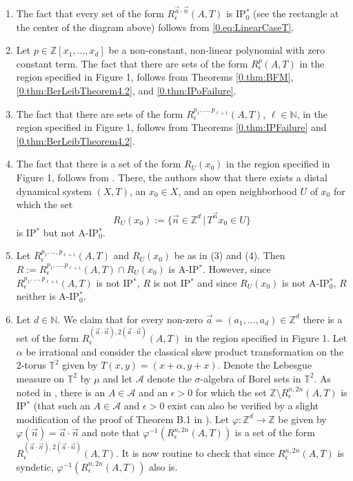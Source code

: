 \documentclass[11pt,american,preprint]{elsarticle}
\numberwithin{equation}{section}
\theoremstyle{plain}
\theoremstyle{plain*}
\theoremstyle{plain}
\theoremstyle{plain*}
\theoremstyle{plain}
\theoremstyle{plain*}
\theoremstyle{remark}
\theoremstyle{remark*}
\theoremstyle{remark}
\theoremstyle{remark*}
\theoremstyle{remark}
\theoremstyle{remark*}
\theoremstyle{plain}
\theoremstyle{definition}
\theoremstyle{plain}
\theoremstyle{plain} %
\newcommand{\N}{\mathbb{N}}
\newcommand{\Z}{\mathbb{Z}}
\begin{document}
\begin{enumerate}[(1)]
\item The fact that  every  set of the form $R_\epsilon^{\vec a\cdot \vec n}(A,T)$ is IP$_0^*$ (see the rectangle at the center of the diagram above) follows from \eqref{0.eq:LinearCaseT}. 
\item Let $p\in\Z[x_1,...,x_d]$ be a non-constant, non-linear polynomial with zero constant term. The fact that there are sets of the form $R_\epsilon^p(A,T)$  in the region specified in Figure 1, follows from Theorems  \ref{0.thm:BFM},  \ref{0.thm:BerLeibTheorem4.2}, and \ref{0.thm:IPoFailure}.
\item The fact that there are sets of the form $R_\epsilon^{p_1,...,p_{\ell+1}}(A,T)$, $\ell\in\N$,  in the region specified in Figure 1, follows from Theorems  \ref{0.thm:IPFailure} and \ref{0.thm:BerLeibTheorem4.2}.
\item The fact that there is a set of the form $R_U(x_0)$  in the region specified in Figure 1, follows from \cite[p. 505]{AlmostIPBerLeib}.  There, the authors show that there exists a distal dynamical system $(X,T)$, an $x_0\in X$, and an open neighborhood $U$ of $x_0$ for which the set 
$$R_U(x_0):=\{\vec n\in \Z^d\,|\,T^{\vec n}x_0\in U\}$$
is IP$^*$ but not A-IP$_0^*$. 
\item Let $R_\epsilon^{p_1,...,p_{\ell+1}}(A,T)$ and $R_U(x_0)$ be as in (3) and (4). Then $R:=R_\epsilon^{p_1,...,p_{\ell+1}}(A,T)\cap R_U(x_0)$ is A-IP$^*$. However, since $R_\epsilon^{p_1,...,p_{\ell+1}}(A,T)$ is not IP$^*$, $R$ is not IP$^*$ and since  $R_U(x_0)$ is not A-IP$_0^*$, $R$ neither is A-IP$_0^*$.
\item Let $d\in\N$. We claim that for every non-zero $\vec a=(a_1,...,a_d)\in \Z^d$ there is a set of the form 
$R^{(\vec a\cdot\vec n),2(\vec a\cdot\vec n)}_\epsilon(A,T)$  in the region specified in Figure 1. Let $\alpha$ be irrational and consider the classical skew product transformation on the 2-torus $\mathbb T^2$ given by $T(x,y)=(x+\alpha,y+x)$. Denote the Lebesgue measure on $\mathbb T^2$ by $\mu$ and let  $\mathcal A$ denote the $\sigma$-algebra of Borel sets in $\mathbb T^2$. 
As noted in \cite[Subsection 8.1]{BHFebruary2003}, there is  an $A\in \mathcal A$ and an $\epsilon>0$ for which the set 
$\Z\setminus R_\epsilon ^{n,2n}(A,T)$ is IP$^*$  (that such an $A\in\mathcal A$ and $\epsilon>0$ exist can also be verified by  a slight modification of the  proof of Theorem  B.1  in  \cite{Shalomkra2025}). Let $\varphi:\Z^d\rightarrow \Z$ be given by $\varphi(\vec n)=\vec a\cdot \vec n$  and note that $\varphi^{-1}(R_\epsilon^{n,2n}(A,T))$ is a set of the form $R_\epsilon^{(\vec a\cdot\vec n),2(\vec a\cdot\vec n)}(A,T)$. It is now routine to check that since $R_\epsilon^{n,2n}(A,T)$ is syndetic, $\varphi^{-1}(R_\epsilon^{n,2n}(A,T))$ also is.\\

\end{enumerate}
\end{document}

